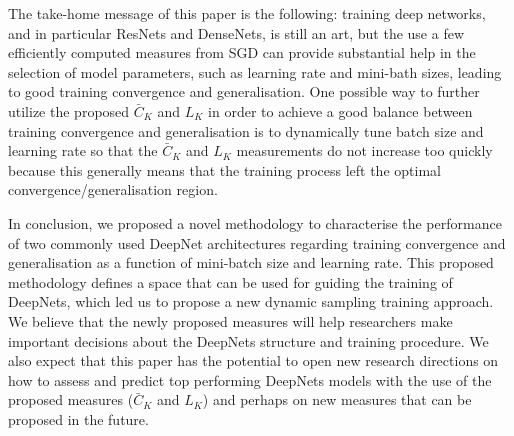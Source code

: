 \documentclass[10pt,journal,compsoc]{IEEEtran}
\begin{document}
The take-home message of this paper is the following: training deep networks, and in particular ResNets and DenseNets, is still an art, but the use a few efficiently computed measures from SGD can provide substantial help in the selection of model parameters, such as learning rate and mini-bath sizes, leading to good training convergence and generalisation.
One possible way to further utilize the proposed $\bar{C}_K$ and $L_K$ in order to achieve a good balance between training convergence and generalisation is to dynamically tune batch size and learning rate so that the $\bar{C}_K$ and $L_K$ measurements do not increase too quickly because this generally means that the training process left the optimal convergence/generalisation region.



In conclusion, we proposed a novel methodology to characterise the performance of two commonly used DeepNet architectures regarding training convergence and generalisation as a function of mini-batch size and learning rate.  
This proposed methodology defines a space that can be used for guiding the training of DeepNets, which led us to propose a new dynamic sampling training approach.  
We believe that the newly proposed measures will help researchers make important decisions about the DeepNets structure and training procedure.  
We also expect that this paper has the potential to open new research directions on how to assess and predict top performing DeepNets models with the use of the proposed measures ($\bar{C}_K$ and $L_K$) and perhaps on new measures that can be proposed in the future.






\end{document}
